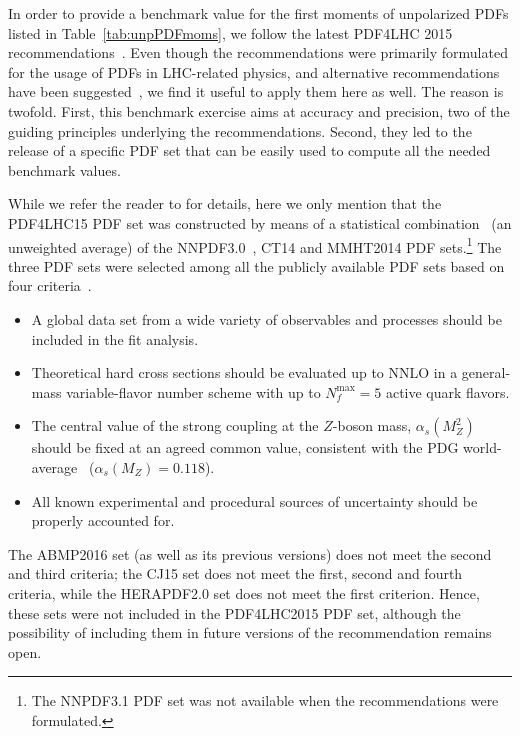 In order to provide a benchmark value for the first moments of unpolarized PDFs
listed in Table~\ref{tab:unpPDFmoms}, we follow the latest PDF4LHC 2015 
recommendations~\cite{Butterworth:2015oua}.
%
Even though the recommendations were primarily formulated for the usage of PDFs
in LHC-related physics, and alternative recommendations have been 
suggested~\cite{Accardi:2016ndt}, we find it useful to apply them here as well.
%
The reason is twofold.
%
First, this benchmark exercise aims at accuracy and precision,  
two of the guiding principles underlying the recommendations.
%
Second, they led to the release of a specific PDF set
that can be easily used to compute all the needed benchmark values.

While we refer the reader to \cite{Butterworth:2015oua} for details,
here we only mention that the PDF4LHC15 PDF set was constructed by means of
a statistical combination~\cite{Carrazza:2015hva,Gao:2013bia,Watt:2012tq,
Carrazza:2015aoa} (an unweighted average) of the 
NNPDF3.0~\cite{Ball:2014uwa}, CT14 and MMHT2014 PDF sets.\footnote{The 
NNPDF3.1 PDF set was not available when the recommendations were formulated.}
%
The three PDF sets were selected among all the publicly available PDF sets
based on four criteria~\cite{Butterworth:2015oua}.
%
\begin{itemize}
%
\item A global data set from a wide variety of observables and processes
should be included in the fit analysis.
%
\item Theoretical hard cross sections should be evaluated up to NNLO in a
general-mass variable-flavor number scheme with up to $N_f^\text{max}=5$ 
active quark flavors.
%
\item The central value of the strong coupling at the $Z$-boson mass,
$\alpha_s(M_Z^2)$ should be fixed at an agreed common value, consistent 
with the PDG world-average~\cite{Olive:2016xmw} ($\alpha_s(M_Z)=0.118$).
%
\item All known experimental and procedural sources of uncertainty should be 
properly accounted for.
%
\end{itemize}
%
The ABMP2016 set (as well as its previous versions) does not meet the second 
and third criteria; the CJ15 set does not meet the first, second and fourth
criteria, while the HERAPDF2.0 set does not meet the first criterion.
%
Hence, these sets were not included in the PDF4LHC2015 PDF set, although the 
possibility of including them in future versions of the recommendation 
remains open.

